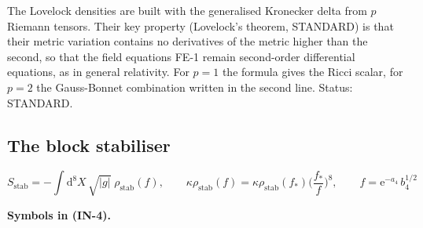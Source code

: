 \documentclass[
  10pt,
]{article}
\begin{document}
The Lovelock densities are built with the generalised Kronecker delta
from \(p\) Riemann tensors. Their key property (Lovelock's theorem,
STANDARD) is that their metric variation contains no derivatives of the
metric higher than the second, so that the field equations FE-1 remain
second-order differential equations, as in general relativity. For
\(p = 1\) the formula gives the Ricci scalar, for \(p = 2\) the
Gauss-Bonnet combination written in the second line. Status: STANDARD.

\hypertarget{the-block-stabiliser}{%
\subsection{The block stabiliser}\label{the-block-stabiliser}}

\[
S_{\mathrm{stab}} = -\int\mathrm{d}^8X\,\sqrt{\lvert g\rvert}\;\rho_{\mathrm{stab}}(f),\qquad
\kappa\rho_{\mathrm{stab}}(f) = \kappa\rho_{\mathrm{stab}}(f_*)\Big(\frac{f_*}{f}\Big)^{8},\qquad
f = \mathrm{e}^{-a_4}\,b_4^{1/2} \tag{IN-4}
\]

\textbf{Symbols in (IN-4).}
\end{document}
